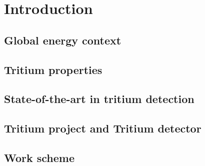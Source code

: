 \documentclass[12pt,a4paper]{book}
\begin{document}
\tableofcontents

\cleardoublepage
{} %

\listoffigures

\cleardoublepage
{} %

\listoftables




\chapter{Introduction}  \label{chap:GeneralIntroduction} %
	\section{Global energy context}
	 \label{sec:Introduction}
	\newpage

	\section{Tritium properties}
	\label{sec:TritiumProperties}
	\newpage
	
	\section{State-of-the-art in tritium detection}
	\label{sec:StateOfTheArt}
	\newpage
	
	\section{Tritium project and Tritium detector}
	\label{sec:TritiumProject}
	\newpage
	
	\section{Work scheme}
	\newpage
\end{document}
